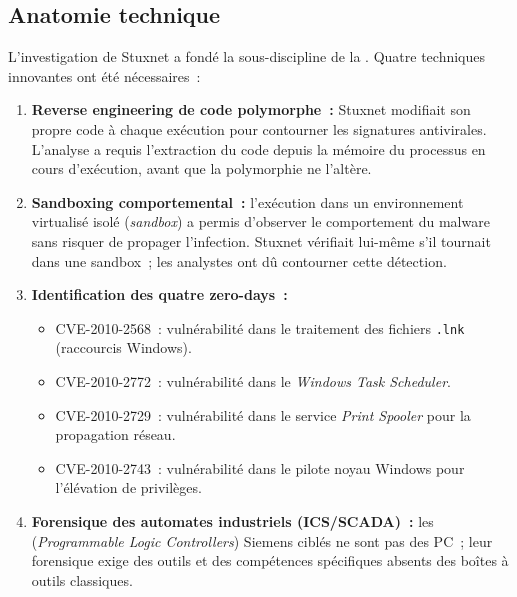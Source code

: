 \subsection{Anatomie technique}

L'investigation de Stuxnet a fondé la sous-discipline de la
.
Quatre techniques innovantes ont été nécessaires~:

\begin{enumerate}
    \item \textbf{Reverse engineering de code polymorphe~:} Stuxnet modifiait
          son propre code à chaque exécution pour contourner les signatures
          antivirales. L'analyse a requis l'extraction du code depuis la
          mémoire du processus en cours d'exécution, avant que la
          polymorphie ne l'altère.

    \item \textbf{Sandboxing comportemental~:} l'exécution dans un
          environnement virtualisé isolé (\textit{sandbox}) a permis
          d'observer le comportement du malware sans risquer de propager
          l'infection. Stuxnet vérifiait lui-même s'il tournait dans une
          sandbox~; les analystes ont dû contourner cette détection.

    \item \textbf{Identification des quatre zero-days~:}
          \begin{itemize}
              \item CVE-2010-2568~: vulnérabilité dans le traitement des
                    fichiers \texttt{.lnk} (raccourcis Windows).
              \item CVE-2010-2772~: vulnérabilité dans le \textit{Windows
                    Task Scheduler}.
              \item CVE-2010-2729~: vulnérabilité dans le service
                    \textit{Print Spooler} pour la propagation réseau.
              \item CVE-2010-2743~: vulnérabilité dans le pilote
                    noyau Windows pour l'élévation de privilèges.
          \end{itemize}

    \item \textbf{Forensique des automates industriels (ICS/SCADA)~:}
          les  (\textit{Programmable Logic Controllers}) Siemens
          ciblés ne sont pas des PC~; leur forensique exige des outils et
          des compétences spécifiques absents des boîtes à outils classiques.
\end{enumerate}

